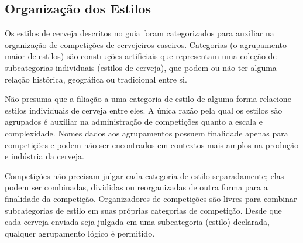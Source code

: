 \subsection*{Organização dos Estilos}
Os estilos de cerveja descritos no guia foram categorizados para auxiliar na organização de competições de cervejeiros caseiros. Categorias (o agrupamento maior de estilos) são construções artificiais que representam uma coleção de subcategorias individuais (estilos de cerveja), que podem ou não ter alguma relação histórica, geográfica ou tradicional entre si.

Não presuma que a filiação a uma categoria de estilo de alguma forma relacione estilos individuais de cerveja entre eles. A única razão pela qual os estilos são agrupados é auxiliar na administração de competições quanto a escala e complexidade. Nomes dados aos agrupamentos possuem finalidade apenas para competições e podem não ser encontrados em contextos mais amplos na produção e indústria da cerveja.

Competições não precisam julgar cada categoria de estilo separadamente; elas podem ser combinadas, divididas ou reorganizadas de outra forma para a finalidade da competição. Organizadores de competições são livres para combinar subcategorias de estilo em suas próprias categorias de competição. Desde que cada cerveja enviada seja julgada em uma subcategoria (estilo) declarada, qualquer agrupamento lógico é permitido.
